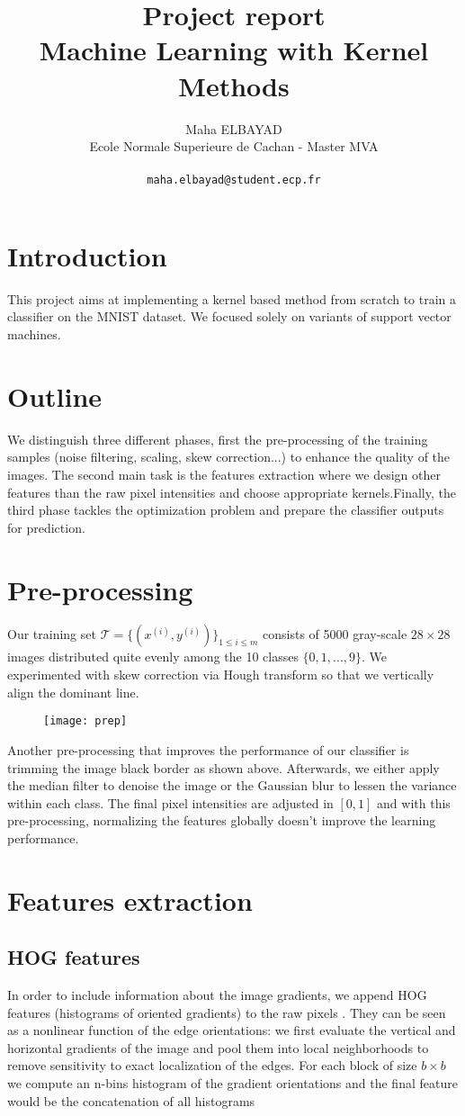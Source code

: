 \documentclass{acmsiggraph}
\title{Project report \\
Machine Learning with Kernel Methods}
\author{Maha ELBAYAD \\
\large{Ecole Normale Superieure de Cachan - Master MVA}\\
\\\texttt{maha.elbayad@student.ecp.fr}}
\newcommand{\1}{\mathbf{1}}
\newcommand{\0}{\mathbf{0}}
\begin{document}
\maketitle

\section{Introduction}
This project aims at implementing a kernel based method from scratch to train a classifier on the MNIST dataset. We focused solely on variants of support vector machines.
\section{Outline}
We distinguish three different phases, first the pre-processing of the training samples (noise filtering, scaling, skew correction...) to enhance the quality of the images. The second main task is the features extraction where we design other features than the raw pixel intensities and choose appropriate kernels.Finally, the third phase tackles the optimization problem and prepare the classifier outputs for prediction.

\section{Pre-processing}
Our training set $\mathcal T=\{(x^{(i)},y^{(i)})\}_{1\leq i\leq m}$ consists of 5000 gray-scale $28\times28$ images distributed quite evenly among the 10 classes $\{0,1,...,9\}$. We experimented with skew correction via Hough transform so that we vertically align the dominant line.
\begin{figure}[H]
\centering
\texttt{[image: prep]}
\end{figure}
Another pre-processing that improves the performance of our classifier is trimming the image black border as shown above. Afterwards, we either apply the median filter to denoise the image or the Gaussian blur to lessen the variance within each class. The final pixel intensities are adjusted in $[0,1]$ and with this pre-processing, normalizing the features globally doesn't improve the learning performance.  

\section{Features extraction}
\subsection{HOG features}
In order to include information about the image gradients, we append HOG features (histograms of oriented gradients) to the raw pixels . They can be seen as a nonlinear function of the edge orientations: we first evaluate the vertical and horizontal gradients of the image and pool them into local neighborhoods to remove sensitivity to exact localization of the edges. For each block of size $b\times b$ we compute an n-bins histogram of the gradient orientations and the final feature would be the concatenation of all histograms
\end{document}
